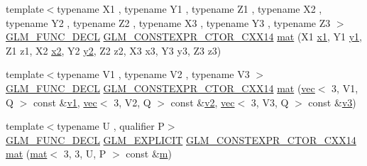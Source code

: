\begin{DoxyCompactItemize}
{\footnotesize template$<$typename X1 , typename Y1 , typename Z1 , typename X2 , typename Y2 , typename Z2 , typename X3 , typename Y3 , typename Z3 $>$ }\\\mbox{\hyperlink{setup_8hpp_ab2d052de21a70539923e9bcbf6e83a51}{G\+L\+M\+\_\+\+F\+U\+N\+C\+\_\+\+D\+E\+CL}} \mbox{\hyperlink{setup_8hpp_a0900f9145e68bf6061b6f5e7be3fa751}{G\+L\+M\+\_\+\+C\+O\+N\+S\+T\+E\+X\+P\+R\+\_\+\+C\+T\+O\+R\+\_\+\+C\+X\+X14}} \mbox{\hyperlink{structglm_1_1mat_3_013_00_013_00_01_t_00_01_q_01_4_a36c7325f7b4164d6ed70aab38cf5828c}{mat}} (X1 \mbox{\hyperlink{_s_d_l__opengl__glext_8h_a49825216c96caaeb09237b36651181c5}{x1}}, Y1 \mbox{\hyperlink{_s_d_l__opengl__glext_8h_a3af6c78fcdfccea028a5878bc747ef39}{y1}}, Z1 z1, X2 \mbox{\hyperlink{_s_d_l__opengl__glext_8h_a7b907a03236685c534d89d604cff23c8}{x2}}, Y2 \mbox{\hyperlink{_s_d_l__opengl__glext_8h_a2be1135ed68e8d80fa9e130c7814f8c2}{y2}}, Z2 z2, X3 x3, Y3 y3, Z3 z3)
\item 
{\footnotesize template$<$typename V1 , typename V2 , typename V3 $>$ }\\\mbox{\hyperlink{setup_8hpp_ab2d052de21a70539923e9bcbf6e83a51}{G\+L\+M\+\_\+\+F\+U\+N\+C\+\_\+\+D\+E\+CL}} \mbox{\hyperlink{setup_8hpp_a0900f9145e68bf6061b6f5e7be3fa751}{G\+L\+M\+\_\+\+C\+O\+N\+S\+T\+E\+X\+P\+R\+\_\+\+C\+T\+O\+R\+\_\+\+C\+X\+X14}} \mbox{\hyperlink{structglm_1_1mat_3_013_00_013_00_01_t_00_01_q_01_4_ae25c721fb8fd4496b8430fc9040b04be}{mat}} (\mbox{\hyperlink{structglm_1_1vec}{vec}}$<$ 3, V1, Q $>$ const \&\mbox{\hyperlink{_s_d_l__opengl__glext_8h_a435c176a02c061b43e19bdf7c86cceae}{v1}}, \mbox{\hyperlink{structglm_1_1vec}{vec}}$<$ 3, V2, Q $>$ const \&\mbox{\hyperlink{_s_d_l__opengl__glext_8h_a0928f6d0f0f794ba000a21dfae422136}{v2}}, \mbox{\hyperlink{structglm_1_1vec}{vec}}$<$ 3, V3, Q $>$ const \&\mbox{\hyperlink{_s_d_l__opengl__glext_8h_acc806b31cbf466ceba6555983d8b814d}{v3}})
\item 
{\footnotesize template$<$typename U , qualifier P$>$ }\\\mbox{\hyperlink{setup_8hpp_ab2d052de21a70539923e9bcbf6e83a51}{G\+L\+M\+\_\+\+F\+U\+N\+C\+\_\+\+D\+E\+CL}} \mbox{\hyperlink{setup_8hpp_a6c74f5a5e7b134ab69023ff9a30d4d5d}{G\+L\+M\+\_\+\+E\+X\+P\+L\+I\+C\+IT}} \mbox{\hyperlink{setup_8hpp_a0900f9145e68bf6061b6f5e7be3fa751}{G\+L\+M\+\_\+\+C\+O\+N\+S\+T\+E\+X\+P\+R\+\_\+\+C\+T\+O\+R\+\_\+\+C\+X\+X14}} \mbox{\hyperlink{structglm_1_1mat_3_013_00_013_00_01_t_00_01_q_01_4_aaaa9738e2310481af8ab062744c2c426}{mat}} (\mbox{\hyperlink{structglm_1_1mat}{mat}}$<$ 3, 3, U, P $>$ const \&\mbox{\hyperlink{_s_d_l__opengl__glext_8h_af593500c283bf1a787a6f947f503a5c2}{m}})

\end{DoxyCompactItemize}
